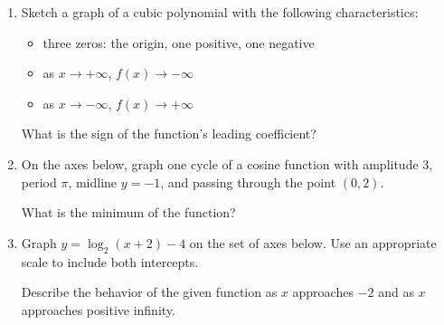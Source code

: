 \documentclass[12pt, oneside]{article}
\begin{document}
\begin{enumerate}
\item Sketch a graph of a cubic polynomial with the following characteristics: 
\begin{itemize}
\item three zeros: the origin, one positive, one negative
\item as $x \rightarrow + \infty$, $f(x) \rightarrow - \infty$
\item as $x \rightarrow - \infty$, $f(x) \rightarrow + \infty$
\end{itemize}
\begin{center}
\end{center} %
What is the sign of the function's leading coefficient?




\newpage
\item On the axes below, graph one cycle of a cosine function with amplitude 3, period $\pi$, midline $y=-1$, and passing through the point $(0,2)$.
\begin{center}
\end{center} %
What is the minimum of the function?

\newpage

\item Graph $y= \log_2(x+2)-4$ on the set of axes below. Use an appropriate scale to include both intercepts.
\begin{center}
\end{center}

Describe the behavior of the given function as $x$ approaches $-2$ and as $x$ approaches positive infinity. %


\end{enumerate}
\end{document}
